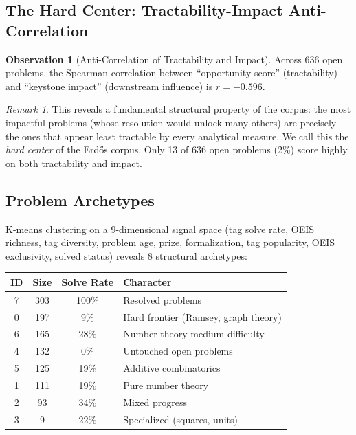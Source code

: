 \documentclass[11pt,a4paper]{article}
\theoremstyle{definition}
\newtheorem{observation}[theorem]{Observation}
\theoremstyle{remark}
\newtheorem{remark}[theorem]{Remark}
\begin{document}
\subsection{The Hard Center: Tractability-Impact Anti-Correlation}

\begin{observation}[Anti-Correlation of Tractability and Impact]
Across 636 open problems, the Spearman correlation between ``opportunity score''
(tractability) and ``keystone impact'' (downstream influence) is
$r = -0.596$.
\end{observation}

\begin{remark}
This reveals a fundamental structural property of the corpus: the most
impactful problems (whose resolution would unlock many others) are precisely
the ones that appear least tractable by every analytical measure. We call
this the \emph{hard center} of the Erd\H{o}s corpus. Only 13 of 636 open
problems (2\%) score highly on both tractability and impact.
\end{remark}

\subsection{Problem Archetypes}

K-means clustering on a 9-dimensional signal space (tag solve rate, OEIS
richness, tag diversity, problem age, prize, formalization, tag popularity,
OEIS exclusivity, solved status) reveals 8 structural archetypes:

\begin{center}
\begin{tabular}{cccp{5cm}}
\toprule
ID & Size & Solve Rate & Character \\
\midrule
7 & 303 & 100\% & Resolved problems \\
0 & 197 & 9\% & Hard frontier (Ramsey, graph theory) \\
6 & 165 & 28\% & Number theory medium difficulty \\
4 & 132 & 0\% & Untouched open problems \\
5 & 125 & 19\% & Additive combinatorics \\
1 & 111 & 19\% & Pure number theory \\
2 & 93 & 34\% & Mixed progress \\
3 & 9 & 22\% & Specialized (squares, units) \\
\bottomrule
\end{tabular}
\end{center}
\end{document}
